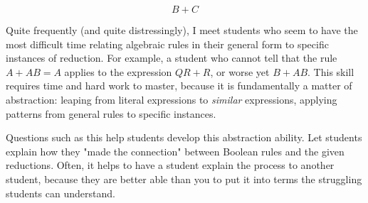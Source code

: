 $$B + C$$







Quite frequently (and quite distressingly), I meet students who seem to have the most difficult time relating algebraic rules in their general form to specific instances of reduction.  For example, a student who cannot tell that the rule $A + AB = A$ applies to the expression $QR + R$, or worse yet $B + AB$.  This skill requires time and hard work to master, because it is fundamentally a matter of abstraction: leaping from literal expressions to {\it similar} expressions, applying patterns from general rules to specific instances.

Questions such as this help students develop this abstraction ability.  Let students explain how they "made the connection" between Boolean rules and the given reductions.  Often, it helps to have a student explain the process to another student, because they are better able than you to put it into terms the struggling students can understand.




